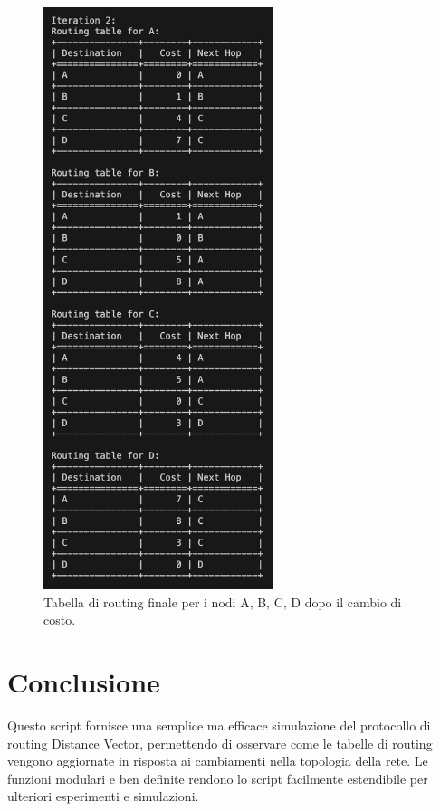 \documentclass{report}
\begin{document}
\begin{figure}[H]
    \centering
    \includegraphics[width=0.6\textwidth]{img/rete3fine.png}
    \caption{Tabella di routing finale per i nodi A, B, C, D dopo il cambio di costo.}
    \label{fig:final_routing_table_3}
\end{figure}

\chapter{Conclusione}
Questo script fornisce una semplice ma efficace simulazione del protocollo di routing Distance Vector, permettendo di osservare come le tabelle di routing vengono aggiornate in risposta ai cambiamenti nella topologia della rete. Le funzioni modulari e ben definite rendono lo script facilmente estendibile per ulteriori esperimenti e simulazioni.
\end{document}

